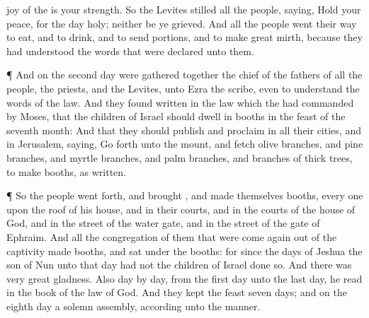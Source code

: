 {joy of the
{} is your
strength.
So the
Levites
stilled all the
people,
saying, Hold your
peace, for the
day
{}
holy; neither be ye
grieved.
And all the
people went their
way to
eat, and to
drink, and to
send
portions, and to
make
great
mirth, because they had
understood the
words that were
declared unto them.
\par }{\PP {}¶ And on the
second
day were gathered
together the
chief of the
fathers of all the
people, the
priests, and the
Levites, unto
Ezra the
scribe, even to
understand the
words of the
law.
And they
found
written in the
law which the
{} had
commanded
by
Moses, that the
children of
Israel should
dwell in
booths in the
feast of the
seventh
month:
And that they should
publish and
proclaim in all their
cities, and in
Jerusalem,
saying, Go
forth unto the
mount, and
fetch
olive
branches, and
pine
branches, and
myrtle
branches, and
palm
branches, and
branches of
thick
trees, to
make
booths, as
{}
written.
\par }{\PP {}¶ So the
people went
forth, and
brought
{}, and
made themselves
booths, every
one upon the roof of his
house, and in their
courts, and in the
courts of the
house of
God, and in the
street of the
water
gate, and in the
street of the
gate of
Ephraim.
And all the
congregation of them that were come
again out of the
captivity
made
booths, and
sat under the
booths: for since the
days of
Jeshua the
son of
Nun unto that
day had not the
children of
Israel done
so. And there was
very
great
gladness.
Also
day by
day, from the
first
day unto the
last
day, he
read in the
book of the
law of
God. And they
kept the
feast
seven
days; and on the
eighth
day
{} a solemn
assembly, according unto the
manner.

}
